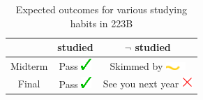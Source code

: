 \begin{center}
    \begin{table}
    \begin{tabular}{ |c|c|c| }
    \hline
            & studied & $\neg$ studied \\ \hline
    Midterm & Pass \includegraphics{fig/check.png} & Skimmed by \includegraphics{fig/almost.png} \\ \hline
    Final   & Pass \includegraphics{fig/check.png} & See you next year \includegraphics {fig/fail.png} \\ \hline
    \end{tabular}
    \caption{Expected outcomes for various studying habits in 223B}
    \label{tab:studyhabits}
\end{table}
\end{center}


